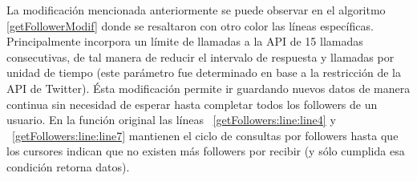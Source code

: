 La modificación mencionada anteriormente se puede observar en el algoritmo \ref{getFollowerModif} donde se resaltaron con otro color las líneas específicas. Principalmente incorpora un límite de llamadas a la API de 15 llamadas consecutivas, de tal manera de reducir el intervalo de respuesta y llamadas por unidad de tiempo (este parámetro fue determinado en base a la restricción de la API de Twitter). Ésta modificación permite ir guardando nuevos datos de manera continua  sin necesidad de esperar hasta completar todos los followers de un usuario. En  la función original las líneas ~\ref{getFollowers:line:line4} y ~\ref{getFollowers:line:line7} mantienen el ciclo de consultas por followers hasta que los cursores indican que no existen más followers por recibir (y sólo cumplida esa condición retorna datos).